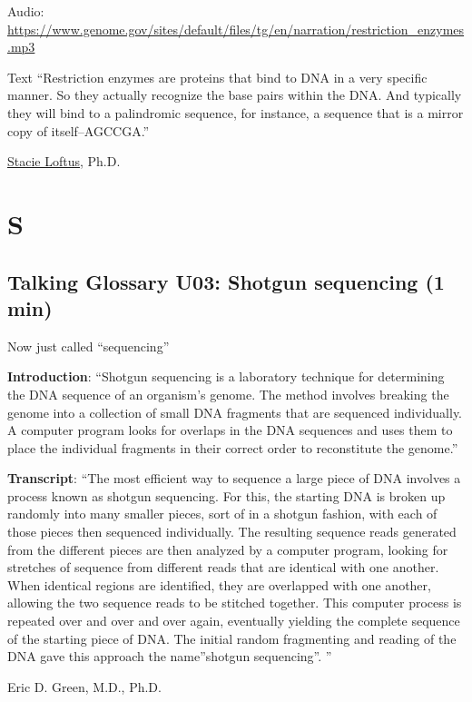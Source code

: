 \documentclass[
]{book}
\begin{document}
Audio: \url{https://www.genome.gov/sites/default/files/tg/en/narration/restriction_enzymes.mp3}

Text ``Restriction enzymes are proteins that bind to DNA in a very specific manner. So they actually recognize the base pairs within the DNA. And typically they will bind to a palindromic sequence, for instance, a sequence that is a mirror copy of itself--AGCCGA.''

\href{https://www.genome.gov/staff/Stacie-Loftus-PhD}{Stacie Loftus}, Ph.D.

\hypertarget{s}{%
\chapter{S}\label{s}}

\hypertarget{talking-glossary-u03-shotgun-sequencing-1-min}{%
\section{Talking Glossary U03: Shotgun sequencing (1 min)}\label{talking-glossary-u03-shotgun-sequencing-1-min}}

Now just called ``sequencing''

\textbf{Introduction}: ``Shotgun sequencing is a laboratory technique for determining the DNA sequence of an organism's genome. The method involves breaking the genome into a collection of small DNA fragments that are sequenced individually. A computer program looks for overlaps in the DNA sequences and uses them to place the individual fragments in their correct order to reconstitute the genome.''

\textbf{Transcript}: ``The most efficient way to sequence a large piece of DNA involves a process known as shotgun sequencing. For this, the starting DNA is broken up randomly into many smaller pieces, sort of in a shotgun fashion, with each of those pieces then sequenced individually. The resulting sequence reads generated from the different pieces are then analyzed by a computer program, looking for stretches of sequence from different reads that are identical with one another. When identical regions are identified, they are overlapped with one another, allowing the two sequence reads to be stitched together. This computer process is repeated over and over and over again, eventually yielding the complete sequence of the starting piece of DNA. The initial random fragmenting and reading of the DNA gave this approach the name''shotgun sequencing''. ''

Eric D. Green, M.D., Ph.D.
\end{document}
